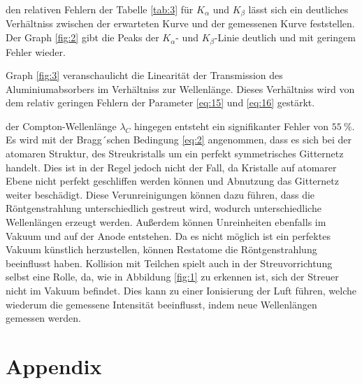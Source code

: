     \justifying den relativen Fehlern der Tabelle \ref{tab:3} für $K_{\alpha}$ und $K_{\beta}$ lässt sich ein deutliches Verhältniss zwischen der
    erwarteten Kurve und der gemessenen Kurve feststellen. Der Graph \ref{fig:2} gibt die Peaks der $K_{\alpha}$- und $K_{\beta}$-Linie deutlich und mit geringem 
    Fehler wieder. 

    \justifying Graph \ref{fig:3} veranschaulicht die Linearität der Transmission des Aluminiumabsorbers im Verhältniss zur Wellenlänge. Dieses Verhältniss
    wird von dem relativ geringen Fehlern der Parameter \eqref{eq:15} und \eqref{eq:16} gestärkt. 

    \justifying der Compton-Wellenlänge $\lambda_C$ hingegen entsteht ein signifikanter Fehler von $\SI{55}{\percent}$. Es wird mit der Bragg´schen Bedingung \eqref{eq:2} 
    angenommen, dass es sich bei der atomaren Struktur, des Streukristalls um ein perfekt symmetrisches Gitternetz handelt. Dies ist in der Regel jedoch nicht der Fall, da Kristalle auf atomarer
    Ebene nicht perfekt geschliffen werden können und Abnutzung das Gitternetz weiter beschädigt. Diese Verunreinigungen können dazu führen, dass die Röntgenstrahlung unterschiedlich gestreut wird, 
    wodurch unterschiedliche Wellenlängen erzeugt werden. Außerdem können Unreinheiten ebenfalls im Vakuum und auf der Anode entstehen. Da es nicht möglich ist ein perfektes Vakuum künstlich herzustellen, 
    können Restatome die Röntgenstrahlung beeinflusst haben. Kollision mit Teilchen spielt auch in der Streuvorrichtung selbst eine Rolle, da, wie in Abbildung \ref{fig:1} zu erkennen ist, sich der 
    Streuer  nicht im Vakuum befindet. Dies kann zu einer Ionisierung der Luft führen, welche wiederum die gemessene Intensität beeinflusst, indem neue Wellenlängen gemessen werden.  

\newpage
\printbibliography

\newpage
\section{Appendix}





